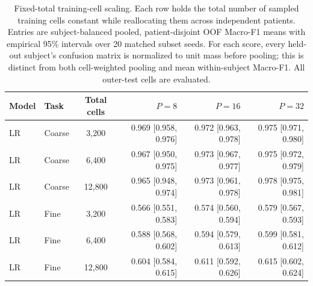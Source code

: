 \begin{table}[H]
\centering
\small
\setlength{\tabcolsep}{4pt}
\begin{tabular}{llcrrr}
\toprule
Model & Task & Total cells & $P=8$ & $P=16$ & $P=32$ \\
\midrule
LR & Coarse & 3,200 & 0.969 [0.958, 0.976] & 0.972 [0.963, 0.978] & 0.975 [0.971, 0.980] \\
LR & Coarse & 6,400 & 0.967 [0.950, 0.975] & 0.973 [0.967, 0.977] & 0.975 [0.972, 0.979] \\
LR & Coarse & 12,800 & 0.965 [0.948, 0.974] & 0.973 [0.961, 0.978] & 0.978 [0.975, 0.981] \\
LR & Fine & 3,200 & 0.566 [0.551, 0.583] & 0.574 [0.560, 0.594] & 0.579 [0.567, 0.593] \\
LR & Fine & 6,400 & 0.588 [0.568, 0.602] & 0.594 [0.579, 0.613] & 0.599 [0.581, 0.612] \\
LR & Fine & 12,800 & 0.604 [0.584, 0.615] & 0.611 [0.592, 0.626] & 0.615 [0.602, 0.624] \\
\midrule
\bottomrule
\end{tabular}
\caption{Fixed-total training-cell scaling. Each row holds the total number of sampled training cells constant while reallocating them across independent patients. Entries are subject-balanced pooled, patient-disjoint OOF Macro-F1 means with empirical 95\% intervals over 20 matched subset seeds. For each score, every held-out subject's confusion matrix is normalized to unit mass before pooling; this is distinct from both cell-weighted pooling and mean within-subject Macro-F1. All outer-test cells are evaluated.}
\label{tab:fixed_total_scaling}
\end{table}
